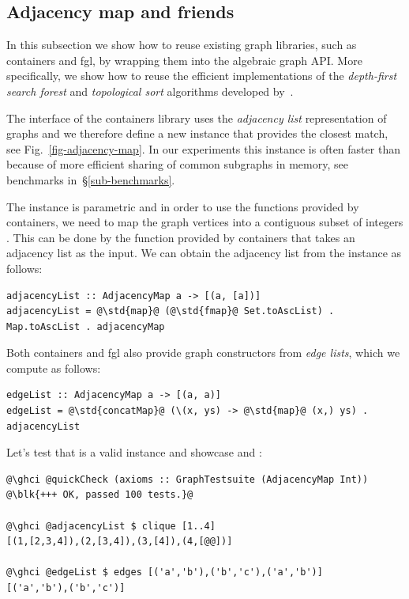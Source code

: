 \subsection{Adjacency map and friends}\label{sub-adjacency-map}

In this subsection we show how to reuse existing graph libraries, such as
\textsf{containers} and \textsf{fgl}, by wrapping them into the algebraic
graph API. More specifically, we show how to reuse the efficient implementations
of the \emph{depth-first search forest} and \emph{topological sort} algorithms
developed by~\citet{1995_king_graphs}.

The interface of the \textsf{containers} library uses the \emph{adjacency list}
representation of graphs and we therefore define a new  instance that
provides the closest match, see Fig.~\ref{fig-adjacency-map}. In our experiments
this instance is often faster than  because of more efficient
sharing of common subgraphs in memory, see benchmarks in~\S\ref{sub-benchmarks}.

The  instance is parametric and in order to use the
functions provided by \textsf{containers}, we need to map the graph vertices
into a contiguous subset of integers . This can be done by the
 function provided by \textsf{containers} that takes an adjacency
list as the input. We can obtain the adjacency list from the 
instance as follows:

\begin{verbatim}
adjacencyList :: AdjacencyMap a -> [(a, [a])]
adjacencyList = @\std{map}@ (@\std{fmap}@ Set.toAscList) . Map.toAscList . adjacencyMap
\end{verbatim}
Both \textsf{containers} and \textsf{fgl} also provide graph constructors from
\emph{edge lists}, which we compute as follows:

\begin{verbatim}
edgeList :: AdjacencyMap a -> [(a, a)]
edgeList = @\std{concatMap}@ (\(x, ys) -> @\std{map}@ (x,) ys) . adjacencyList
\end{verbatim}

\noindent
Let's test that  is a valid  instance and
showcase  and :

\begin{verbatim}
@\ghci @quickCheck (axioms :: GraphTestsuite (AdjacencyMap Int))
@\blk{+++ OK, passed 100 tests.}@

@\ghci @adjacencyList $ clique [1..4]
[(1,[2,3,4]),(2,[3,4]),(3,[4]),(4,[@@])]

@\ghci @edgeList $ edges [('a','b'),('b','c'),('a','b')]
[('a','b'),('b','c')]
\end{verbatim}

